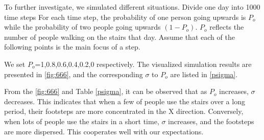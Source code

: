 \documentclass[12pt]{article}  %
\numberwithin{equation}{section} %
\begin{document}
To further investigate, we simulated different situations. Divide one day into 1000 time steps For each time step, the probability of one person going upwards is $P_o$  while  the probability of two people going upwards $(1-P_o)$. $P_o$ reflects the number of people walking on the stairs that day. Assume that each of the following points is the main focus of a step. 

We set $P_o$=1,0.8,0.6,0.4,0.2,0 respectively. The visualized simulation results are presented in \autoref{fig:666}, and the corresponding $\sigma$ to  $P_o$ are listed in \autoref{psigma}. 

From the \autoref{fig:666} and Table \ref{psigma}, it can be observed that as $P_o$ increases, $\sigma$ decreases. This indicates that when a few of people use the stairs over a long period, their footsteps are more concentrated in the X direction. Conversely, when lots of people use the stairs in a short time, $\sigma$ increases, and the footsteps are more dispersed. This cooperates well with our expectations.
\end{document}
